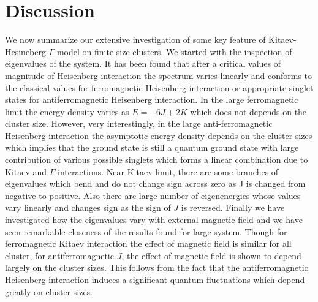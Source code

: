 \documentclass[aps,amsmath,twocolumn,amssymb,floatfix,showpacs,superscriptaddress,nofootinbib,longbibliography]{revtex4-1}
\begin{document}
\section{Discussion}
\label{discussion}
We now summarize our extensive investigation of some key feature of Kitaev-Hesineberg-$\Gamma$ model on finite size clusters. We started  with the inspection of eigenvalues of the system. It has been found that after a critical values of magnitude of Heisenberg interaction the spectrum varies linearly and conforms to the classical values for ferromagnetic Heisenberg interaction or appropriate singlet states for antiferromagnetic Heisenberg interaction. In the large ferromagnetic limit the energy density  varies as $E=-6 J + 2 K$ which does not depends on the cluster size. However, very interestingly, in the large anti-ferromagnetic Heisenberg interaction the asymptotic energy density depends on the cluster sizes which implies that the ground state is still a quantum ground state with large contribution of various possible  singlets which forms a linear combination due to Kitaev and $\Gamma$ interactions.  Near Kitaev limit, there are some branches of  eigenvalues which bend and do not change sign across zero as J is changed from negative to positive. Also there are large number of eigenenergies whose values vary linearly and  changes sign as the sign of $J$ is reversed.  Finally we have investigated how the eigenvalues vary with external magnetic field and we have seen remarkable closeness of the results found for large system. Though for ferromagnetic Kitaev interaction the effect of magnetic field is similar for all cluster, for antiferromagnetic $J$, the effect of magnetic field is shown to depend largely on the cluster sizes. This follows from the fact that the antiferromagnetic Heisenberg interaction induces  a significant quantum fluctuations which depend greatly on cluster sizes. \\
\indent
\end{document}

